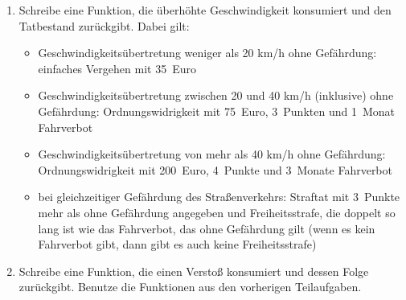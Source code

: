 \begin{aufgabe}
\begin{enumerate}
  \item Schreibe eine Funktion, die überhöhte
    Geschwindigkeit konsumiert und den Tatbestand zurückgibt.  Dabei
    gilt:
    \begin{itemize}
    \item Geschwindigkeitsübertretung weniger als 20 km/h ohne Gefährdung:
      einfaches Vergehen mit 35~Euro
    \item Geschwindigkeitsübertretung zwischen 20 und 40 km/h
      (inklusive) ohne Gefährdung: Ordnungswidrigkeit mit 75~Euro,
      3~Punkten und 1~Monat Fahrverbot
    \item Geschwindigkeitsübertretung von mehr als 40 km/h ohne
      Gefährdung: Ordnungswidrigkeit mit 200~Euro, 4~Punkte und
      3~Monate Fahrverbot
    \item bei gleichzeitiger Gefährdung des Straßenverkehrs: Straftat
      mit 3~Punkte mehr als ohne Gefährdung angegeben und
      Freiheitsstrafe, die doppelt so lang ist wie das Fahrverbot, das
      ohne Gefährdung gilt (wenn es kein Fahrverbot gibt, dann gibt es
      auch keine Freiheitsstrafe)
    \end{itemize}

  \item Schreibe eine Funktion, die einen
    Verstoß konsumiert und dessen Folge zurückgibt.  Benutze die
    Funktionen aus den vorherigen Teilaufgaben.
  \end{enumerate}
\end{aufgabe}


